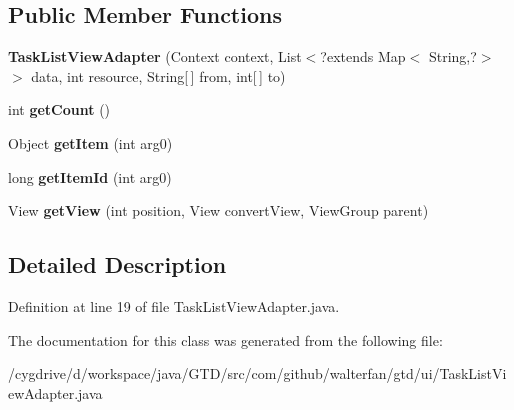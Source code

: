\subsection*{Public Member Functions}
\begin{DoxyCompactItemize}
\item 
\hypertarget{classcom_1_1github_1_1walterfan_1_1gtd_1_1ui_1_1TaskListViewAdapter_a16ce4f34c31ab4479a998b111e1d070b}{{\bfseries Task\-List\-View\-Adapter} (Context context, List$<$?extends Map$<$ String,?$>$$>$ data, int resource, String\mbox{[}$\,$\mbox{]} from, int\mbox{[}$\,$\mbox{]} to)}\label{classcom_1_1github_1_1walterfan_1_1gtd_1_1ui_1_1TaskListViewAdapter_a16ce4f34c31ab4479a998b111e1d070b}

\item 
\hypertarget{classcom_1_1github_1_1walterfan_1_1gtd_1_1ui_1_1TaskListViewAdapter_ae55097a4eba00793ba94dccdfb6924e5}{int {\bfseries get\-Count} ()}\label{classcom_1_1github_1_1walterfan_1_1gtd_1_1ui_1_1TaskListViewAdapter_ae55097a4eba00793ba94dccdfb6924e5}

\item 
\hypertarget{classcom_1_1github_1_1walterfan_1_1gtd_1_1ui_1_1TaskListViewAdapter_afa7348a72edd4f40b3aa3e240c4ebd23}{Object {\bfseries get\-Item} (int arg0)}\label{classcom_1_1github_1_1walterfan_1_1gtd_1_1ui_1_1TaskListViewAdapter_afa7348a72edd4f40b3aa3e240c4ebd23}

\item 
\hypertarget{classcom_1_1github_1_1walterfan_1_1gtd_1_1ui_1_1TaskListViewAdapter_a2289872d7e3292eaca44bc0fd00b8e78}{long {\bfseries get\-Item\-Id} (int arg0)}\label{classcom_1_1github_1_1walterfan_1_1gtd_1_1ui_1_1TaskListViewAdapter_a2289872d7e3292eaca44bc0fd00b8e78}

\item 
\hypertarget{classcom_1_1github_1_1walterfan_1_1gtd_1_1ui_1_1TaskListViewAdapter_ad3551650560e65d4b10baccb16af70ef}{View {\bfseries get\-View} (int position, View convert\-View, View\-Group parent)}\label{classcom_1_1github_1_1walterfan_1_1gtd_1_1ui_1_1TaskListViewAdapter_ad3551650560e65d4b10baccb16af70ef}

\end{DoxyCompactItemize}


\subsection{Detailed Description}


Definition at line 19 of file Task\-List\-View\-Adapter.\-java.



The documentation for this class was generated from the following file\-:\begin{DoxyCompactItemize}
\item 
/cygdrive/d/workspace/java/\-G\-T\-D/src/com/github/walterfan/gtd/ui/Task\-List\-View\-Adapter.\-java\end{DoxyCompactItemize}
